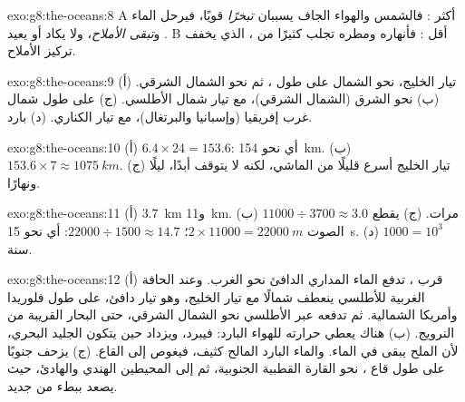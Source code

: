 \begin{solution}{exo:g8:the-oceans:8}
 A أكثر : فالشمس والهواء الجاف يسببان \emph{تبخرًا} قويًا،
فيرحل الماء و\emph{تبقى الأملاح}، ولا يكاد  أو  يعيد
\emph{}.  B أقل : فأنهاره ومطره تجلب كثيرًا من
\emph{}، الذي يخفف تركيز الأملاح.
\end{solution}

\begin{solution}{exo:g8:the-oceans:9}
(أ) تيار الخليج، نحو الشمال على طول ، ثم نحو الشمال الشرقي. (ب) نحو
الشرق (الشمال الشرقي)، مع تيار شمال الأطلسي. (ج) على طول  شمال غرب
إفريقيا (وإسبانيا والبرتغال)، مع تيار الكناري. (د)
بارد.
\end{solution}

\begin{solution}{exo:g8:the-oceans:10}
(أ) $6.4 \times 24 = 153.6$: أي نحو \qty{154}{km}. (ب) $153.6 \times 7
\approx \qty{1075}{km}$. (ج) تيار الخليج أسرع قليلًا من الماشي، لكنه لا
يتوقف أبدًا، ليلًا ونهارًا.
\end{solution}

\begin{solution}{exo:g8:the-oceans:11}
(أ) \qty{3.7}{km} و\qty{11}{km}. (ب) $11000 \div 3700 \approx 3.0$
مرات. (ج) يقطع الصوت $2 \times 11000 = \qty{22000}{m}$؛ $22000
\div 1500 \approx 14.7$: أي نحو \qty{15}{s}. (د) $1000 = 10^3$ سنة.
\end{solution}

\begin{solution}{exo:g8:the-oceans:12}
(أ) قرب ، تدفع  الماء المداري الدافئ نحو الغرب.
وعند الحافة الغربية للأطلسي ينعطف شمالًا مع تيار الخليج، وهو تيار دافئ، على
طول فلوريدا وأمريكا الشمالية. ثم تدفعه  عبر الأطلسي نحو الشمال
الشرقي، حتى البحار القريبة من النرويج. (ب) هناك يعطي حرارته للهواء البارد:
فيبرد، ويزداد  حين يتكون الجليد البحري، لأن الملح يبقى في الماء.
والماء البارد المالح كثيف، فيغوص إلى القاع. (ج) يزحف جنوبًا على طول قاع
، نحو القارة القطبية الجنوبية، ثم إلى المحيطين الهندي والهادئ، حيث
يصعد ببطء من جديد.
\end{solution}

